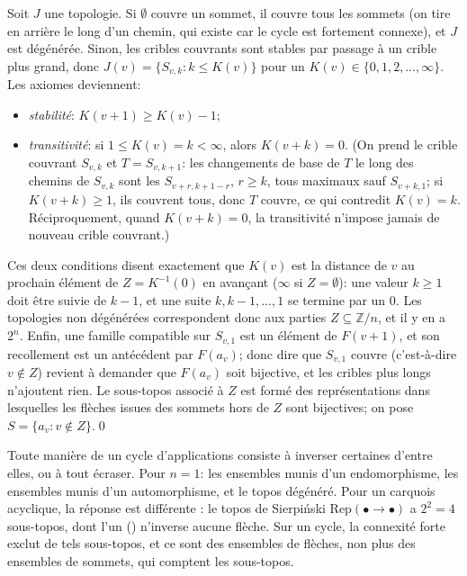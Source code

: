 Soit $J$ une topologie. Si $\emptyset$ couvre un sommet, il couvre tous les sommets (on tire en arrière le long d'un chemin, qui existe car le cycle est fortement connexe), et $J$ est dégénérée. Sinon, les cribles couvrants sont stables par passage à un crible plus grand, donc $J(v) = \{S_{v,k} : k\le K(v)\}$ pour un $K(v)\in\{0,1,2,\dots,\infty\}$. Les axiomes deviennent:
\begin{itemize}
\item \emph{stabilité}: $K(v+1)\ge K(v)-1$;
\item \emph{transitivité}: si $1\le K(v) = k<\infty$, alors $K(v+k) = 0$. (On prend le crible couvrant $S_{v,k}$ et $T = S_{v,k+1}$: les changements de base de $T$ le long des chemins de $S_{v,k}$ sont les $S_{v+r,k+1-r}$, $r\ge k$, tous maximaux sauf $S_{v+k,1}$; si $K(v+k)\ge 1$, ils couvrent tous, donc $T$ couvre, ce qui contredit $K(v) = k$. Réciproquement, quand $K(v+k) = 0$, la transitivité n'impose jamais de nouveau crible couvrant.)
\end{itemize}
Ces deux conditions disent exactement que $K(v)$ est la distance de $v$ au prochain élément de $Z = K^{-1}(0)$ en avançant ($\infty$ si $Z = \emptyset$): une valeur $k\ge 1$ doit être suivie de $k-1$, et une suite $k, k-1,\dots,1$ se termine par un $0$. Les topologies non dégénérées correspondent donc aux parties $Z\subseteq\mathbb Z/n$, et il y en a $2^n$. Enfin, une famille compatible sur $S_{v,1}$ est un élément de $F(v+1)$, et son recollement est un antécédent par $F(a_v)$; donc dire que $S_{v,1}$ couvre (c'est-à-dire $v\notin Z$) revient à demander que $F(a_v)$ soit bijective, et les cribles plus longs n'ajoutent rien. Le sous-topos associé à $Z$ est formé des représentations dans lesquelles les flèches issues des sommets hors de $Z$ sont bijectives; on pose $S = \{a_v : v\notin Z\}$.\qed

\inwords{} Toute manière de  un cycle d'applications consiste à inverser certaines d'entre elles, ou à tout écraser. Pour $n = 1$: les ensembles munis d'un endomorphisme, les ensembles munis d'un automorphisme, et le topos dégénéré. Pour un carquois acyclique, la réponse est différente \cite{schmid}: le topos de Sierpiński $\mathrm{Rep}(\bullet\to\bullet)$ a $2^2 = 4$ sous-topos, dont l'un () n'inverse aucune flèche. Sur un cycle, la connexité forte exclut de tels sous-topos, et ce sont des ensembles de flèches, non plus des ensembles de sommets, qui comptent les sous-topos.
